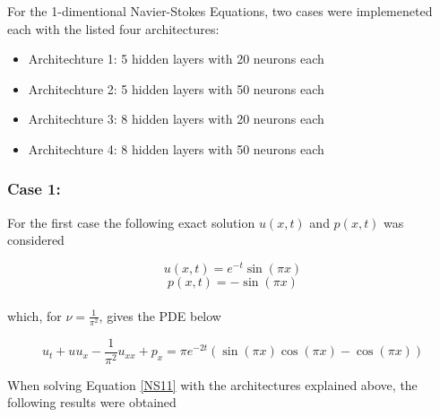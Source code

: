 \documentclass[12pt,letterpaper]{article}
\begin{document}
For the 1-dimentional Navier-Stokes Equations, two cases were implemeneted each with the listed four architectures:

\begin{itemize}
  \item Architechture 1: 5 hidden layers with 20 neurons each
  \item Architechture 2: 5 hidden layers with 50 neurons each
  \item Architechture 3: 8 hidden layers with 20 neurons each
  \item Architechture 4: 8 hidden layers with 50 neurons each
\end{itemize}

\subsubsection*{Case 1:}

For the first case the following exact solution $u(x,t)$ and $p(x,t)$ was considered

$$u(x,t) = e^{-t}\sin(\pi x)$$
$$p(x,t) = -\sin(\pi x)$$\\

which, for $\nu=\frac{1}{\pi^2}$, gives the PDE below

\begin{equation}
  \label{NS11}
  u_t + u u_x - \frac{1}{\pi^2}u_{xx} + p_x = \pi e^{-2t}\left(\sin(\pi x)\cos(\pi x) - \cos(\pi x)\right) 
\end{equation}

When solving Equation \ref{NS11} with the architectures explained above, the following results were obtained
\end{document}
